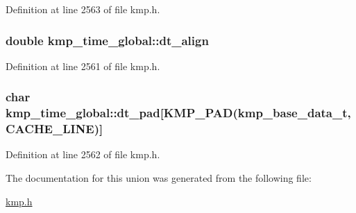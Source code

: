 Definition at line 2563 of file kmp.\-h.

\hypertarget{unionkmp__time__global_a605cfd0b6711e1888aa3101c3924356b}{
\subsubsection[{dt\-\_\-align}]{\setlength{\rightskip}{0pt plus 5cm}double kmp\-\_\-time\-\_\-global\-::dt\-\_\-align}}\label{unionkmp__time__global_a605cfd0b6711e1888aa3101c3924356b}


Definition at line 2561 of file kmp.\-h.

\hypertarget{unionkmp__time__global_a64f185eac5ca727cb2ca06d7a9146c65}{
\subsubsection[{dt\-\_\-pad}]{\setlength{\rightskip}{0pt plus 5cm}char kmp\-\_\-time\-\_\-global\-::dt\-\_\-pad\mbox{[}{\bf K\-M\-P\-\_\-\-P\-A\-D}({\bf kmp\-\_\-base\-\_\-data\-\_\-t}, {\bf C\-A\-C\-H\-E\-\_\-\-L\-I\-N\-E})\mbox{]}}}\label{unionkmp__time__global_a64f185eac5ca727cb2ca06d7a9146c65}


Definition at line 2562 of file kmp.\-h.



The documentation for this union was generated from the following file\-:\begin{DoxyCompactItemize}
\item 
\hyperlink{kmp_8h}{kmp.\-h}\end{DoxyCompactItemize}

